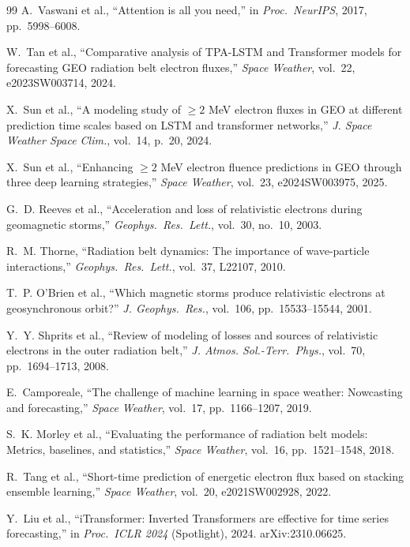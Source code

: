 ﻿\documentclass{ieeeaccess}
\begin{document}
\begin{thebibliography}{99}
A.~Vaswani et al., ``Attention is all you need,'' in \emph{Proc.\ NeurIPS},
2017, pp.~5998--6008.

W.~Tan et al., ``Comparative analysis of TPA-LSTM and Transformer models
for forecasting GEO radiation belt electron fluxes,'' \emph{Space Weather},
vol.~22, e2023SW003714, 2024.

X.~Sun et al., ``A modeling study of \(\ge2\) MeV electron fluxes in GEO
at different prediction time scales based on LSTM and transformer networks,''
\emph{J. Space Weather Space Clim.}, vol.~14, p.~20, 2024.

X.~Sun et al., ``Enhancing \(\ge2\) MeV electron fluence predictions in GEO
through three deep learning strategies,'' \emph{Space Weather}, vol.~23,
e2024SW003975, 2025.

G.~D. Reeves et al., ``Acceleration and loss of relativistic electrons
during geomagnetic storms,'' \emph{Geophys.\ Res.\ Lett.}, vol.~30,
no.~10, 2003.

R.~M. Thorne, ``Radiation belt dynamics: The importance of wave-particle
interactions,'' \emph{Geophys.\ Res.\ Lett.}, vol.~37, L22107, 2010.

T.~P. O'Brien et al., ``Which magnetic storms produce relativistic
electrons at geosynchronous orbit?'' \emph{J. Geophys.\ Res.},
vol.~106, pp.~15533--15544, 2001.

Y.~Y. Shprits et al., ``Review of modeling of losses and sources of
relativistic electrons in the outer radiation belt,'' \emph{J. Atmos.
Sol.-Terr.\ Phys.}, vol.~70, pp.~1694--1713, 2008.

E.~Camporeale, ``The challenge of machine learning in space weather:
Nowcasting and forecasting,'' \emph{Space Weather}, vol.~17, pp.~1166--1207,
2019.

S.~K. Morley et al., ``Evaluating the performance of radiation belt models:
Metrics, baselines, and statistics,'' \emph{Space Weather}, vol.~16,
pp.~1521--1548, 2018.

R.~Tang et al., ``Short-time prediction of energetic electron flux based
on stacking ensemble learning,'' \emph{Space Weather}, vol.~20,
e2021SW002928, 2022.

Y.~Liu et al., ``iTransformer: Inverted Transformers are effective for time
series forecasting,'' in \emph{Proc.\ ICLR 2024} (Spotlight), 2024.
arXiv:2310.06625.


\end{thebibliography}
\end{document}
